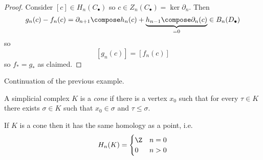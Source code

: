 \documentclass[a4paper]{article}
\renewcommand{\b}{\partial} %
\begin{document}
\begin{proof}
  Consider \([c] \in H_n(C_\bullet)\) so \(c \in Z_n(C_\bullet) = \ker \b_n\). Then
  \[
    g_n(c) - f_n(c) = \b_{n + 1} \compose h_n(c) + \underbrace{h_{n - 1} \compose \b_n(c)}_{= 0} \in B_n(D_\bullet)
  \]
  so
  \[
    [g_n(c)] = [f_n(c)]
  \]
  so \(f_* = g_*\) as claimed.
\end{proof}

\begin{eg}
  Continuation of the previous example.
\end{eg}

\begin{definition}[cone]
  A simplicial complex \(K\) is a \emph{cone} if there is a vertex \(x_0\) such that for every \(\tau \in K\) there exists \(\sigma \in K\) such that \(x_0 \in \sigma\) and \(\tau \leq \sigma\).
\end{definition}

\begin{lemma}
  If \(K\) is a cone then it has the same homology as a point, i.e.
  \[
    H_n(K) =
    \begin{cases}
      \Z & n = 0 \\
      0 & n > 0
    \end{cases}
  \]
\end{lemma}
\end{document}
